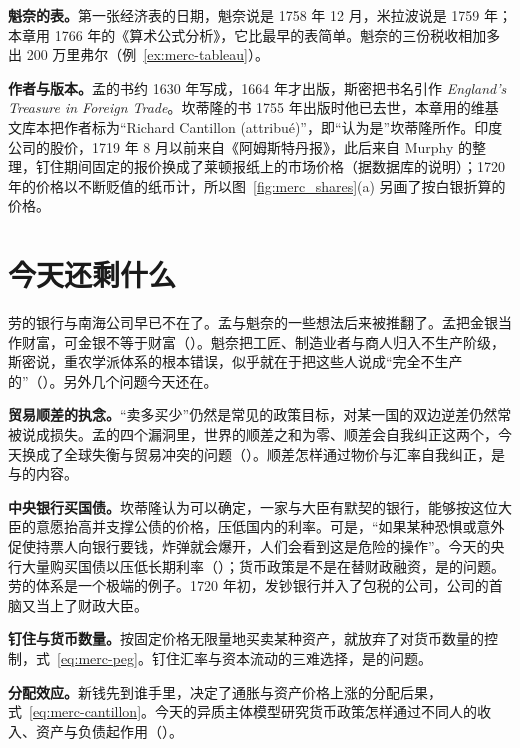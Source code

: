 \begin{deeper}[史料与几处不一致]
\textbf{魁奈的表。}第一张经济表的日期，魁奈说是 1758 年 12 月，米拉波说是 1759 年；本章用 1766 年的《算术公式分析》，它比最早的表简单。魁奈的三份税收相加多出 200 万里弗尔（例~\ref{ex:merc-tableau}）。

\textbf{作者与版本。}孟的书约 1630 年写成，1664 年才出版，斯密把书名引作 \emph{England's Treasure in Foreign Trade}。坎蒂隆的书 1755 年出版时他已去世，本章用的维基文库本把作者标为“Richard Cantillon (attribué)”，即“认为是”坎蒂隆所作。印度公司的股价，1719 年 8 月以前来自《阿姆斯特丹报》，此后来自 Murphy 的整理，钉住期间固定的报价换成了莱顿报纸上的市场价格（据数据库的说明）；1720 年的价格以不断贬值的纸币计，所以图~\ref{fig:merc_shares}(a) 另画了按白银折算的价格。
\end{deeper}

\section{今天还剩什么}\label{sec:merc-legacy}

劳的银行与南海公司早已不在了。孟与魁奈的一些想法后来被推翻了。孟把金银当作财富，可金银不等于财富（）。魁奈把工匠、制造业者与商人归入不生产阶级，斯密说，重农学派体系的根本错误，似乎就在于把这些人说成“完全不生产的”\cite{smith1776}（）。另外几个问题今天还在。

\textbf{贸易顺差的执念。}“卖多买少”仍然是常见的政策目标，对某一国的双边逆差仍然常被说成损失。孟的四个漏洞里，世界的顺差之和为零、顺差会自我纠正这两个，今天换成了全球失衡与贸易冲突的问题（）。顺差怎样通过物价与汇率自我纠正，是与的内容。

\textbf{中央银行买国债。}坎蒂隆认为可以确定，一家与大臣有默契的银行，能够按这位大臣的意愿抬高并支撑公债的价格，压低国内的利率。可是，“如果某种恐惧或意外促使持票人向银行要钱，炸弹就会爆开，人们会看到这是危险的操作”\cite{cantillon1755}。今天的央行大量购买国债以压低长期利率（）；货币政策是不是在替财政融资，是的问题。劳的体系是一个极端的例子。1720 年初，发钞银行并入了包税的公司，公司的首脑又当上了财政大臣。

\textbf{钉住与货币数量。}按固定价格无限量地买卖某种资产，就放弃了对货币数量的控制，式~\eqref{eq:merc-peg}。钉住汇率与资本流动的三难选择，是的问题。

\textbf{分配效应。}新钱先到谁手里，决定了通胀与资产价格上涨的分配后果，式~\eqref{eq:merc-cantillon}。今天的异质主体模型研究货币政策怎样通过不同人的收入、资产与负债起作用（）。

